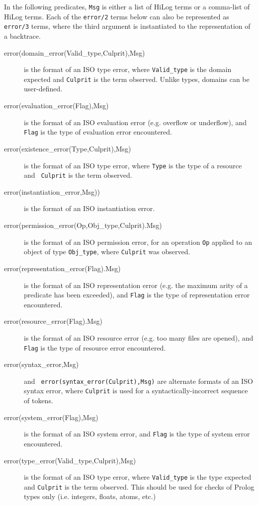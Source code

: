 In the following predicates, {\tt Msg} is either a list of HiLog terms
or a comma-list of HiLog terms.  Each of the {\tt error/2} terms below
can also be represented as {\tt error/3} terms, where the third
argument is instantiated to the representation of a backtrace.

\begin{description}
\item [error(domain\_error(Valid\_type,Culprit),Msg)] is the format of
  an ISO type error, where {\tt Valid\_type} is the domain expected
  and {\tt Culprit} is the term observed.  Unlike types, domains can
  be user-defined.
%
\item[error(evaluation\_error(Flag),Msg)] is the format of an ISO
  evaluation error (e.g. overflow or underflow), and {\tt Flag} is the
  type of evaluation error encountered.
%
\item [error(existence\_error(Type,Culprit),Msg)] is the format of an
  ISO type error, where {\tt Type} is the type of a resource and {\tt
    Culprit} is the term observed.
%
\item[error(instantiation\_error,Msg))] is the format of an ISO
  instantiation error.
%
\item [error(permission\_error(Op,Obj\_type,Culprit).Msg)] is the format of
  an ISO permission error, for an operation {\tt Op} applied to an
  object of type {\tt Obj\_type}, where {\tt Culprit} was observed.
%
\item[error(representation\_error(Flag).Msg)] is the format of an ISO
  representation error (e.g. the maximum arity of a predicate has been
  exceeded), and {\tt Flag} is the type of representation error
  encountered.
%
\item[error(resource\_error(Flag).Msg)] is the format of an ISO
  resource error (e.g. too many files are opened), and {\tt Flag} is
  the type of resource error encountered.
%
\item[error(syntax\_error,Msg)] and {\tt
  error(syntax\_error(Culprit),Msg)} are alternate formats of an ISO
  syntax error, where {\tt Culprit} is used for a
  syntactically-incorrect sequence of tokens.
%
\item[error(system\_error(Flag),Msg)] is the format of an ISO system error,
  and {\tt Flag} is the type of system error encountered.
%
\item[error(type\_error(Valid\_type,Culprit),Msg)] is the format of an
  ISO type error, where {\tt Valid\_type} is the type expected and
  {\tt Culprit} is the term observed.  This should be used for checks
  of Prolog types only (i.e. integers, floats, atoms, etc.)
%
\end{description}

